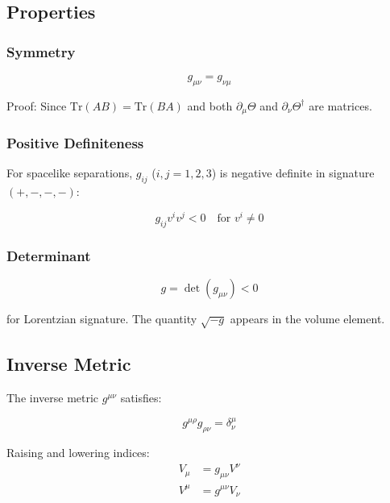 \subsection{Properties}

\subsubsection{Symmetry}

\begin{equation}
\label{eq:canonical:metric_symmetry}
g_{\mu\nu} = g_{\nu\mu}
\end{equation}

Proof: Since $\text{Tr}(AB) = \text{Tr}(BA)$ and both $\partial_\mu\Theta$ and $\partial_\nu\Theta^\dagger$ are matrices.

\subsubsection{Positive Definiteness}

For spacelike separations, $g_{ij}$ ($i,j=1,2,3$) is negative definite in signature $(+,-,-,-)$:

\begin{equation}
\label{eq:canonical:metric_spacelike}
g_{ij} v^i v^j < 0 \quad \text{for } v^i \neq 0
\end{equation}

\subsubsection{Determinant}

\begin{equation}
\label{eq:canonical:metric_determinant}
g = \det(g_{\mu\nu}) < 0
\end{equation}

for Lorentzian signature. The quantity $\sqrt{-g}$ appears in the volume element.

\subsection{Inverse Metric}

The inverse metric $g^{\mu\nu}$ satisfies:

\begin{equation}
\label{eq:canonical:inverse_metric}
g^{\mu\rho} g_{\rho\nu} = \delta^\mu_\nu
\end{equation}

Raising and lowering indices:
\begin{align}
V_\mu &= g_{\mu\nu} V^\nu \label{eq:canonical:lower_index} \\
V^\mu &= g^{\mu\nu} V_\nu \label{eq:canonical:raise_index}
\end{align}

